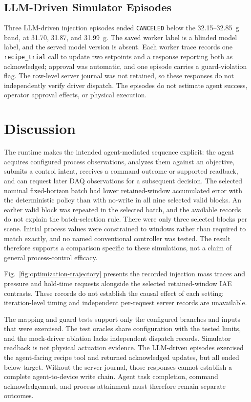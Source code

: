 \documentclass[journal]{IEEEtran}
\begin{document}
\subsection{LLM-Driven Simulator Episodes}
\label{sec:eval-agent}
Three LLM-driven injection episodes ended \texttt{CANCELED} below the 32.15--32.85~g band, at 31.70, 31.87, and 31.99~g. The saved worker label is a blinded model label, and the served model version is absent. Each worker trace records one \texttt{recipe\_trial} call to update two setpoints and a response reporting both as acknowledged; approval was automatic, and one episode carries a guard-violation flag. The row-level server journal was not retained, so these responses do not independently verify driver dispatch. The episodes do not estimate agent success, operator approval effects, or physical execution.

 \section{Discussion}
\label{sec:discussion}
The runtime makes the intended agent-mediated sequence explicit: the agent acquires configured process observations, analyzes them against an objective, submits a control intent, receives a command outcome or supported readback, and can request later DAQ observations for a subsequent decision. The selected nominal fixed-horizon batch had lower retained-window accumulated error with the deterministic policy than with no-write in all nine selected valid blocks. An earlier valid block was repeated in the selected batch, and the available records do not explain the batch-selection rule. There were only three selected blocks per scene. Initial process values were constrained to windows rather than required to match exactly, and no named conventional controller was tested. The result therefore supports a comparison specific to these simulations, not a claim of general process-control efficacy.

Fig.~\ref{fig:optimization-trajectory} presents the recorded injection mass traces and pressure and hold-time requests alongside the selected retained-window IAE contrasts. These records do not establish the causal effect of each setting: iteration-level timing and independent per-request server records are unavailable.

The mapping and guard tests support only the configured branches and inputs that were exercised. The test oracles share configuration with the tested limits, and the mock-driver ablation lacks independent dispatch records. Simulator readback is not physical actuation evidence. The LLM-driven episodes exercised the agent-facing recipe tool and returned acknowledged updates, but all ended below target. Without the server journal, those responses cannot establish a complete agent-to-device write chain. Agent task completion, command acknowledgement, and process attainment must therefore remain separate outcomes.
\end{document}
